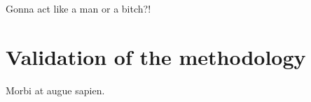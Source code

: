 

\begin{savequote}[50mm]
Gonna act like a man or a bitch?!
\end{savequote}


\chapter{Validation of the methodology}
\label{cha:Validation of the methodology}

\ifpdf
    \graphicspath{{4_experiments_and_results/figures/PNG/}{4_experiments_and_results/figures/PDF/}{4_experiments_and_results/figures/}}
\else
    \graphicspath{{4_experiments_and_results/figures/EPS/}{4_experiments_and_results/figures/}}
\fi



Morbi at augue sapien.






